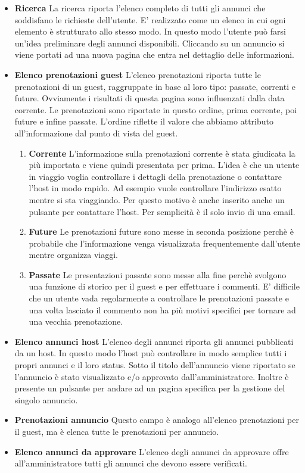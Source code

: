 \documentclass[1_relazione.tex]{subfiles}
\begin{document}
\begin{itemize}
\item \textbf{Ricerca}
La ricerca riporta l'elenco completo di tutti gli annunci che soddisfano le richieste dell'utente. E' realizzato come un elenco in cui ogni elemento è strutturato allo stesso modo. In questo modo l'utente può farsi un'idea preliminare degli annunci disponibili. Cliccando su un annuncio si viene portati ad una nuova pagina che entra nel dettaglio delle informazioni.

\item\textbf{Elenco prenotazioni guest}
L'elenco prenotazioni riporta tutte le prenotazioni di un guest, raggruppate in base al loro tipo: passate, correnti e future. Ovviamente i risultati di questa pagina sono influenzati dalla data corrente. Le prenotazioni sono riportate in questo ordine, prima corrente, poi future e infine passate. L'ordine riflette il valore che abbiamo attributo all'informazione dal punto di vista del guest.
\begin{enumerate}
\item \textbf{Corrente} L'informazione sulla prenotazioni corrente è stata giudicata la più importata e viene quindi presentata per prima. L'idea è che un utente in viaggio voglia controllare i dettagli della prenotazione o contattare l'host in modo rapido. Ad esempio vuole controllare l'indirizzo esatto mentre si sta viaggiando. Per questo motivo è anche inserito anche un pulsante per contattare l'host. Per semplicità è il solo invio di una email.
\item \textbf{Future} Le prenotazioni future sono messe in seconda posizione perchè è probabile che l'informazione venga visualizzata frequentemente dall'utente mentre organizza viaggi. 
\item \textbf{Passate} Le presentazioni passate sono messe alla fine perchè svolgono una funzione di storico per il guest e  per effettuare i commenti. E' difficile che un utente vada regolarmente a controllare le prenotazioni passate e una volta lasciato il commento non ha più motivi specifici per tornare ad una vecchia prenotazione.
\end{enumerate}

\item \textbf{Elenco annunci host}
L'elenco degli annunci riporta gli annunci pubblicati da un host. In questo modo l'host può controllare in modo semplice tutti i propri annunci e il loro status. Sotto il titolo dell'annuncio viene riportato se l'annuncio è stato visualizzato e/o approvato dall'amministratore. Inoltre è presente un pulsante per andare ad un pagina specifica per la gestione del singolo annuncio. 

\item \textbf{Prenotazioni annuncio} Questo campo è analogo all'elenco prenotazioni per il guest, ma è elenca tutte le prenotazioni per annuncio. 

\item \textbf{Elenco annunci da approvare}
L'elenco degli annunci da approvare offre all'amministratore tutti gli annunci che devono essere verificati. 

\end{itemize}
\end{document}
